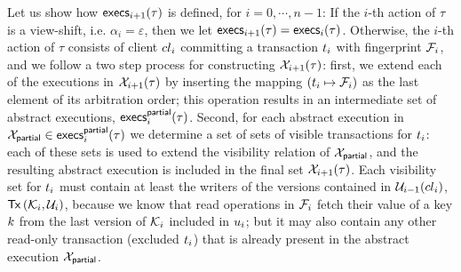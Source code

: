 Let us show how $\execs_{i+1}(\tau)$ is defined, for $i=0,\cdots,n-1$: 
If the $i$-th action of $\tau$ is a view-shift, i.e. $\alpha_{i} = \varepsilon$, then 
we let $\execs_{i+1}(\tau) = \execs_ {i}(\tau)$. Otherwise, the $i$-th action of $\tau$ consists of client ${cl}_{i}$ committing a 
transaction $t_{i}$ with fingerprint $\mathcal{F}_{i}$, and we follow a two step process for constructing $\mathcal{X}_{i+1}(\tau)$: first, we extend each of the 
executions in $\mathcal{X}_{i+1}(\tau)$ by inserting the mapping $(t_{i} \mapsto \mathcal{F}_{i})$ as the last element of its arbitration order; this operation 
results in an intermediate set of abstract executions, $\execs_{i}^{\mathsf{partial}}(\tau)$. Second, for each 
abstract execution in $\aexec_{\mathsf{partial}} \in \execs_{i}^{\mathsf{partial}}(\tau)$ we determine a set of sets of visible transactions for $t_{i}$:  
each of these sets is used to extend the visibility relation of $\mathcal{X}_{\mathsf{partial}}$, and the resulting abstract execution  is included in  the final 
set $\mathcal{X}_{i+1}(\tau)$. Each visibility set for $t_{i}$ must contain at least the writers of the versions contained in $\mathcal{U}_{i-1}({cl}_{i})$, 
$\Tx[\hh_{i}, \vienv_{i}]$, because we know that read operations in $\mathcal{F}_{i}$ fetch their value of a key $k$ from the 
last version of $\mathcal{K}_{i}$ included in $u_{i}$; but it may also contain any other read-only transaction 
(excluded $t_{i}$) that is already present in the abstract execution $\mathcal{X}_{\mathsf{partial}}$.

